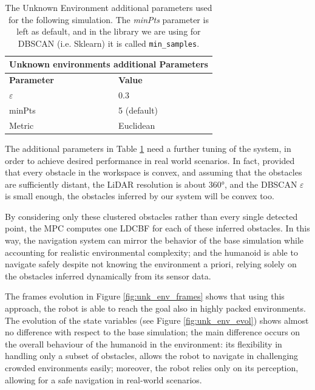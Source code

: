 \begin{table}[h]
        \begin{tabular}{ |p{4cm}||p{4cm}| }
             \hline
             \multicolumn{2}{|c|}{Unknown environments additional Parameters} \\
             \hline
             \textbf{Parameter} & \textbf{Value}\\
             \hline
             $\varepsilon$ & 0.3 \\
             minPts & 5 (default) \\
             Metric & Euclidean \\
             \hline
        \end{tabular}
    \centering
    \caption{The Unknown Environment additional parameters used for the following simulation. The \textit{minPts}
        parameter is left as default, and in the library we are using for DBSCAN (i.e. Sklearn) it is called
    \texttt{min\_samples}.}
    \label{tab:dbscan-params}
\end{table}

The additional parameters in Table \ref{tab:dbscan-params} need a further tuning of the system, in order to achieve
desired performance in real world scenarios. In fact, provided that every obstacle in the workspace is convex, and
assuming that the obstacles are sufficiently distant, the LiDAR resolution is about 360°, and the
DBSCAN $\varepsilon$ is small enough, the obstacles inferred by our system will
be convex too.

By considering only these clustered obstacles rather than every single detected point, the MPC
computes one LDCBF for each of these inferred obstacles. In this way, the navigation system can mirror
the behavior of the base simulation while accounting for realistic environmental complexity; and the humanoid is
able to navigate safely despite not knowing the environment a priori, relying solely on the obstacles inferred dynamically from its sensor data.

The frames evolution in Figure \ref{fig:unk_env_frames} shows that using this approach, the robot is able to reach
the goal also in highly packed environments.
The evolution of the state variables (see
Figure \ref{fig:unk_env_evol}) shows almost no difference with respect to the base simulation; the main difference occurs on the overall behaviour
of the humanoid in the environment: its flexibility in handling only a subset of obstacles, allows the robot to
navigate in challenging crowded environments easily; moreover, the robot relies only on its perception, allowing
for a safe navigation in real-world scenarios.


